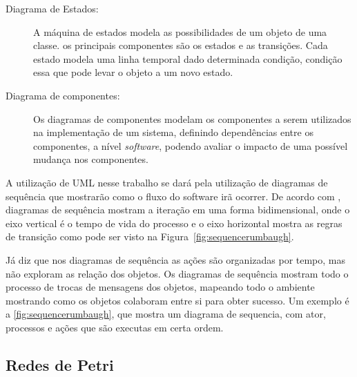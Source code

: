 \begin{description}
    
    \item[Diagrama de Estados:]A máquina de estados modela as possibilidades de um objeto de uma classe. os principais componentes são os estados e as transições. Cada estado modela uma linha temporal dado determinada condição, condição essa que pode levar o objeto a um novo estado.

      
    
    \item[Diagrama de componentes:]Os diagramas de componentes modelam os componentes a serem utilizados na implementação de um sistema, definindo dependências entre os componentes, a nível \textit{software}, podendo avaliar o impacto de uma possível mudança nos componentes.

    
\end{description}



A utilização de UML nesse trabalho se dará pela utilização de diagramas de sequência que mostrarão como o fluxo do software irã ocorrer. De acordo com , diagramas de sequência mostram a iteração em uma forma bidimensional, onde o eixo vertical é o tempo de vida do processo e o eixo horizontal mostra as regras de transição como pode ser visto na Figura~\ref{fig:sequencerumbaugh}. %

Já  diz que nos diagramas de sequência as ações são organizadas por tempo, mas não exploram as relação dos objetos. Os diagramas de sequência mostram todo o processo de trocas de mensagens dos objetos, mapeando todo o ambiente mostrando como os objetos colaboram entre si para obter sucesso. Um exemplo é a \autoref{fig:sequencerumbaugh}, que mostra um diagrama de sequencia, com ator, processos e ações que são executas em certa ordem. 





\subsection{Redes de Petri}

